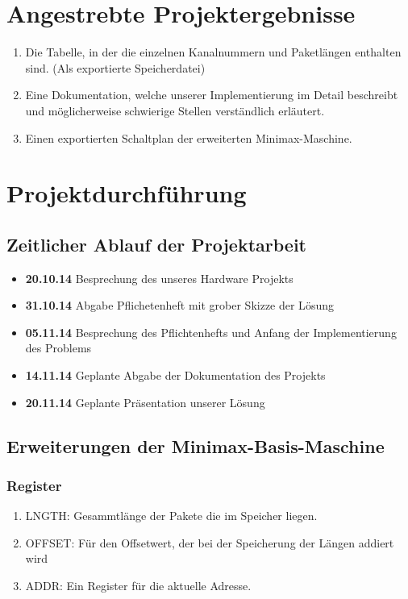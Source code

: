 \documentclass[12pt,titlepage]{article}
\begin{document}
\section{Angestrebte Projektergebnisse}
\begin{enumerate}
\item Die Tabelle, in der die einzelnen Kanalnummern und Paketl{\"a}ngen enthalten sind. (Als exportierte Speicherdatei)
\item Eine Dokumentation, welche unserer Implementierung im Detail beschreibt und m{\"o}glicherweise schwierige Stellen verst{\"a}ndlich erl{\"a}utert.
\item Einen exportierten Schaltplan der erweiterten Minimax-Maschine.
\end{enumerate}

\section{Projektdurchf{\"u}hrung}

\subsection{Zeitlicher Ablauf der Projektarbeit}

\begin{itemize}
\item [] \textbf{20.10.14} Besprechung des unseres Hardware Projekts
\item [] \textbf{31.10.14} Abgabe Pflichetenheft mit grober Skizze der L{\"o}sung
\item [] \textbf{05.11.14} Besprechung des Pflichtenhefts und Anfang der Implementierung des Problems
\item [] \textbf{14.11.14} Geplante Abgabe der Dokumentation des Projekts
\item [] \textbf{20.11.14} Geplante Pr{\"a}sentation unserer Lösung
\end{itemize}

\subsection{Erweiterungen der Minimax-Basis-Maschine}

\subsubsection{Register}

\begin{enumerate}
\item LNGTH: Gesammtl{\"a}nge der Pakete die im Speicher liegen.
\item OFFSET: F{\"u}r den Offsetwert, der bei der Speicherung der Längen addiert wird
\item ADDR: Ein Register f{\"u}r die aktuelle Adresse.
\end{enumerate}
\end{document}
